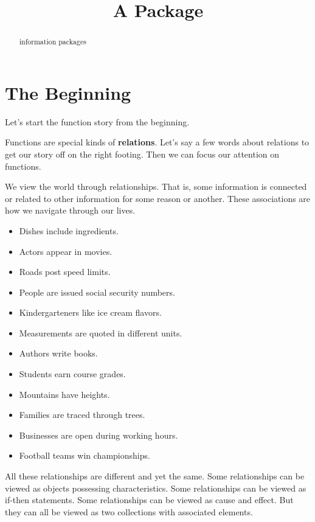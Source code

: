 \documentclass{ximera}
\title{A Package}
\begin{document}
\begin{abstract}
information packages
\end{abstract}
\maketitle





\section*{The Beginning}



Let's start the function story from the beginning. 


Functions are special kinds of \textbf{\textcolor{blue!55!black}{relations}}.  Let's say a few words about relations to get our story off on the right footing.  Then we can focus our attention on functions. 



We view the world through relationships. That is, some information is connected or related to other information for some reason or another. These associations are how we navigate through our lives.

\begin{itemize}
\item Dishes include ingredients.
\item Actors appear in movies.
\item Roads post speed limits.
\item People are issued social security numbers.
\item Kindergarteners like ice cream flavors.
\item Measurements are quoted in different units.
\item Authors write books.
\item Students earn course grades.
\item Mountains have heights.
\item Families are traced through trees.
\item Businesses are open during working hours.
\item Football teams win championships.
\end{itemize}


All these relationships are different and yet the same.  Some relationships can be viewed as objects possessing characteristics. Some relationships can be viewed as if-then statements.  Some relationships can be viewed as cause and effect. But they can all be viewed as two collections with associated elements.
\end{document}
